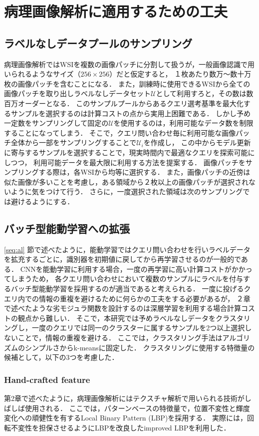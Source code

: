 \section{病理画像解析に適用するための工夫}
\subsection{ラベルなしデータプールのサンプリング}
病理画像解析ではWSIを複数の画像パッチに分割して扱うが，一般画像認識で用いられるようなサイズ（$256 \times 256$）だと仮定すると，
１枚あたり数万〜数十万枚の画像パッチを含むことになる．
また，訓練時に使用できるWSIから全ての画像パッチを取り出しラベルなしデータセット$\mathcal{U}$として利用すろと，その数は数百万オーダーとなる．
このサンプルプールからあるクエリ選考基準を最大化するサンプルを選択するのは計算コストの点から実用上困難である．
しかし予め一定数をサンプリングして固定の$\mathcal{U}$を使用するのは，利用可能なデータ数を制限することになってしまう．
そこで，クエリ問い合わせ毎に利用可能な画像パッチ全体から一部をサンプリングすることで$\mathcal{U}_i$を作成し，
この中からモデル更新に寄与するサンプルを選択することで，現実時間内で最適なクエリを探索可能にしつつ，
利用可能データを最大限に利用する方法を提案する．
画像パッチをサンプリングする際は，各WSIから均等に選択する．
また，画像パッチの近傍は似た画像が多いことを考慮し，ある領域から２枚以上の画像パッチが選択されないように気をつけて行う．
さらに，一度選択された領域は次のサンプリングでは避けるようにする．

\subsection{バッチ型能動学習への拡張}
\ref{seq:al} 節で述べたように，能動学習ではクエリ問い合わせを行いラベルデータを拡充するごとに，識別器を初期値に戻してから再学習させるのが一般的である．
CNNを能動学習に利用する場合，一度の再学習に高い計算コストがかかってしまうため，
各クエリ問い合わせにおいて複数のサンプルにラベルを付与するバッチ型能動学習を採用するのが適当であると考えられる．
一度に投げるクエリ内での情報の重複を避けるために何らかの工夫をする必要があるが，
２章で述べたような劣モジュラ関数を設計するのは深層学習を利用する場合計算コストの観点から難しい．
そこで，本研究では予めラベルなしデータをクラスタリングし，一度のクエリでは同一のクラスターに属するサンプルを2つ以上選択しないことで，情報の重複を避ける．
ここでは，クラスタリング手法はアルゴリズムのシンプルさからk-meansに固定した．
クラスタリングに使用する特徴量の候補として，以下の3つを考慮した．

\subsubsection{\textbf{Hand-crafted feature}}
第2章で述べたように，病理画像解析にはテクスチャ解析で用いられる技術がしばしば使用される．
ここでは，パターンベースの特徴量で，位置不変性と輝度変化への頑健性を有するLocal Binary Pattern (LBP)\cite{ojala2002multiresolution}を採用する．
実際には，回転不変性を担保させるようにLBPを改良したimproved LBPを利用した．

